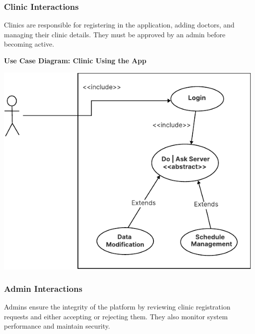\documentclass[12pt]{report}
\begin{document}
\subsubsection{\textbf{Clinic Interactions}}
Clinics are responsible for registering in the application, adding doctors, and managing their clinic details. They must be approved by an admin before becoming active.

\vspace{0.5cm}
\noindent \textbf{Use Case Diagram: Clinic Using the App}
\begin{center}
	\includegraphics[width=\textwidth]{images/doctorCAS.pdf} %
\end{center}

\subsubsection{\textbf{Admin Interactions}}
Admins ensure the integrity of the platform by reviewing clinic registration requests and either accepting or rejecting them. They also monitor system performance and maintain security.
\end{document}
